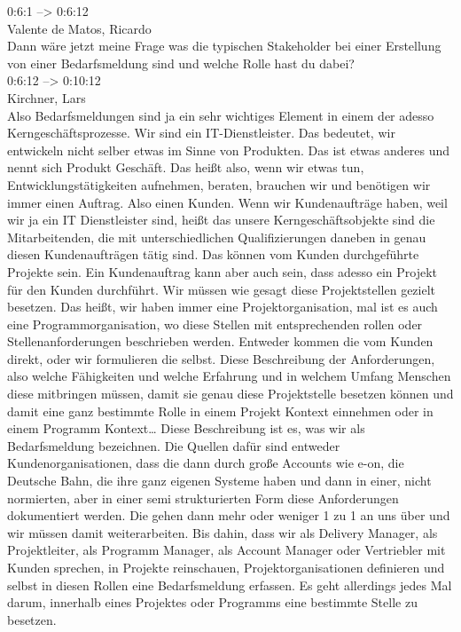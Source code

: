 0:6:1 --> 0:6:12\\
Valente de Matos, Ricardo\\
Dann wäre jetzt meine Frage was die typischen Stakeholder bei einer Erstellung von einer Bedarfsmeldung sind und welche Rolle hast du dabei?\\

0:6:12 --> 0:10:12\\
Kirchner, Lars\\
Also Bedarfsmeldungen sind ja ein sehr wichtiges Element in einem der adesso Kerngeschäftsprozesse. Wir sind ein IT-Dienstleister. Das bedeutet, wir entwickeln nicht selber etwas im Sinne von Produkten. Das ist etwas anderes und nennt sich Produkt Geschäft. Das heißt also, wenn wir etwas tun, Entwicklungstätigkeiten aufnehmen, beraten, brauchen wir und benötigen wir immer einen Auftrag. Also einen Kunden. Wenn wir Kundenaufträge haben, weil wir ja ein IT Dienstleister sind, heißt das unsere Kerngeschäftsobjekte sind die Mitarbeitenden, die mit unterschiedlichen Qualifizierungen daneben in genau diesen Kundenaufträgen tätig sind. Das können vom Kunden durchgeführte Projekte sein. Ein Kundenauftrag kann aber auch sein, dass adesso ein Projekt für den Kunden durchführt. Wir müssen wie gesagt diese Projektstellen gezielt besetzen. Das heißt, wir haben immer eine Projektorganisation, mal ist es auch eine Programmorganisation, wo diese Stellen mit entsprechenden rollen oder Stellenanforderungen beschrieben werden. Entweder kommen die vom Kunden direkt, oder wir formulieren die selbst. Diese Beschreibung der Anforderungen, also welche Fähigkeiten und welche Erfahrung und in welchem Umfang Menschen diese mitbringen müssen, damit sie genau diese Projektstelle besetzen können und damit eine ganz bestimmte Rolle in einem Projekt Kontext einnehmen oder in einem Programm Kontext… Diese Beschreibung ist es, was wir als Bedarfsmeldung bezeichnen. Die Quellen dafür sind entweder Kundenorganisationen, dass die dann durch große Accounts wie e-on, die Deutsche Bahn, die ihre ganz eigenen Systeme haben und dann in einer, nicht normierten, aber in einer semi strukturierten Form diese Anforderungen dokumentiert werden. Die gehen dann mehr oder weniger 1 zu 1 an uns über und wir müssen damit weiterarbeiten. Bis dahin, dass wir als Delivery Manager, als Projektleiter, als Programm Manager, als Account Manager oder Vertriebler mit Kunden sprechen, in Projekte reinschauen, Projektorganisationen definieren und selbst in diesen Rollen eine Bedarfsmeldung erfassen. Es geht allerdings jedes Mal darum, innerhalb eines Projektes oder Programms eine bestimmte Stelle zu besetzen.\\

